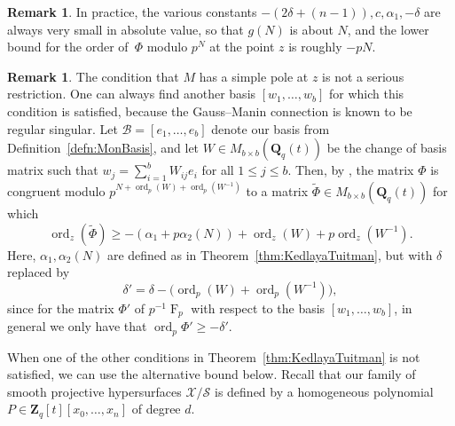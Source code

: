 \documentclass[a4paper,11pt]{article}
\numberwithin{equation}{section}
\newcommand{\ZZ}{\mathbf{Z}} %
\newcommand{\QQ}{\mathbf{Q}} %
\DeclareMathOperator{\ord}{ord}          %
\DeclareMathOperator{\Frob}{F}           %
\providecommand{\cB}{\mathcal{B}} %
\theoremstyle{definition}
\newtheorem{rem}[thm]{Remark}
\begin{document}
\begin{rem}
In practice, the various constants $-(2 \delta + (n-1)), c, \alpha_1, -\delta$ 
are always very small in absolute value, so that $g(N)$ is about $N$, and 
the lower bound for the order of~$\Phi$ modulo $p^N$ at the point $z$ is 
roughly $-pN$.
\end{rem}

\begin{rem} \label{rem:basischange}
The condition that $M$ has a simple pole at $z$ is not a serious restriction. 
One can always find another basis $[w_1, \dotsc, w_b]$ for which this condition is 
satisfied, because the Gauss--Manin connection is known to be regular singular. 
Let $\cB=[e_1,\dotsc,e_b]$ denote our basis from Definition~\ref{defn:MonBasis},
and let $W \in M_{b \times b}(\QQ_q(t))$ 
be the change of basis matrix such that $w_j = \sum_{i=1}^b W_{ij} e_i$ for all 
$1 \leq j \leq b$. Then, by \citep[Corollary 2.6]{KedlayaTuitman2012}, the matrix 
$\Phi$ %
is congruent modulo $p^{N+\ord_p(W)+\ord_p(W^{-1})}$ 
to a matrix $\tilde{\Phi} \in M_{b \times b}(\QQ_q(t))$ for which
\[
\ord_z(\tilde{\Phi}) \geq -(\alpha_1+p \alpha_2(N))+\ord_z(W)+p\ord_z(W^{-1}).
\]
Here, $\alpha_1, \alpha_2(N)$ are defined as in 
Theorem~\ref{thm:KedlayaTuitman}, but with $\delta$ replaced by
\begin{equation*}
\delta' = \delta-\bigl(\ord_p(W)+\ord_p(W^{-1})\bigr), 
\end{equation*}
since for the matrix $\Phi'$ of $p^{-1}\Frob_p$ with respect to the basis 
$[w_1,\dotsc,w_b]$, in general we only have that $\ord_p{\Phi'} \geq -\delta'$. 
\end{rem}

When one of the other conditions in Theorem~\ref{thm:KedlayaTuitman} is not satisfied,
we can use the alternative bound below. Recall that our family of smooth projective 
hypersurfaces $\mathcal{X}/\mathcal{S}$ is defined by a homogeneous polynomial 
$P \in \ZZ_q[t][x_0,\dotsc,x_n]$ of degree $d$.
\end{document}
